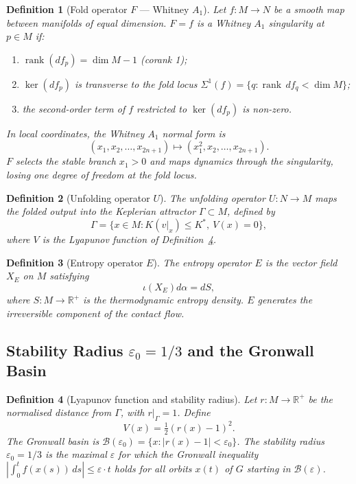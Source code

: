 \documentclass[12pt]{article}
\numberwithin{equation}{section}
\newtheorem{definition}{Definition}[section]
\theoremstyle{remark}
\DeclareMathOperator{\rank}{rank}
\begin{document}
\begin{definition}[Fold operator $F$ --- Whitney $A_1$]
Let $f:M\to N$ be a smooth map between manifolds of equal dimension.
$F = f$ is a \emph{Whitney $A_1$ singularity} at $p\in M$ if:
\begin{enumerate}[label=(\arabic*),leftmargin=*]
  \item $\rank(df_p) = \dim M - 1$ (corank 1);
  \item $\ker(df_p)$ is transverse to the fold locus
        $\Sigma^1(f) = \{q : \rank\,df_q < \dim M\}$;
  \item the second-order term of $f$ restricted to $\ker(df_p)$ is non-zero.
\end{enumerate}
In local coordinates, the Whitney $A_1$ normal form is
\[
  (x_1,x_2,\ldots,x_{2n+1})\mapsto(x_1^2,x_2,\ldots,x_{2n+1}).
\]
$F$ selects the stable branch $x_1>0$ and maps dynamics through the singularity,
losing one degree of freedom at the fold locus.
\end{definition}

\begin{definition}[Unfolding operator $U$]
The \emph{unfolding operator} $U:N\to M$ maps the folded output into the
Keplerian attractor $\Gamma\subset M$, defined by
\[
  \Gamma = \{x\in M : K(v|_x)\leq K^*,\ V(x)=0\},
\]
where $V$ is the Lyapunov function of Definition~\ref{def:lyapunov}.
\end{definition}

\begin{definition}[Entropy operator $E$]
The \emph{entropy operator} $E$ is the vector field $X_E$ on $M$ satisfying
\[
  \iota(X_E)d\alpha = dS,
\]
where $S:M\to\mathbb{R}^+$ is the thermodynamic entropy density.
$E$ generates the irreversible component of the contact flow.
\end{definition}

\subsection{Stability Radius \texorpdfstring{$\varepsilon_0 = 1/3$}{e0 = 1/3} and the Gronwall Basin}

\begin{definition}[Lyapunov function and stability radius]\label{def:lyapunov}
Let $r:M\to\mathbb{R}^+$ be the normalised distance from $\Gamma$,
with $r|_\Gamma = 1$. Define
\[
  V(x) = \tfrac{1}{2}(r(x)-1)^2.
\]
The \emph{Gronwall basin} is $\mathcal{B}(\varepsilon_0) = \{x:|r(x)-1|<\varepsilon_0\}$.
The \emph{stability radius} $\varepsilon_0 = 1/3$ is the maximal $\varepsilon$ for which
the Gronwall inequality
$|\int_0^t f(x(s))\,ds|\leq\varepsilon\cdot t$
holds for all orbits $x(t)$ of $G$ starting in $\mathcal{B}(\varepsilon)$.
\end{definition}
\end{document}
